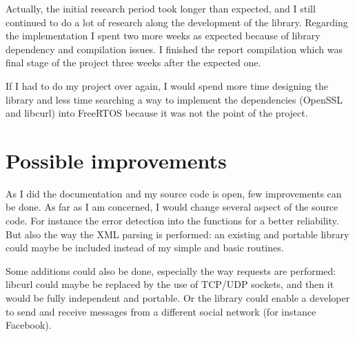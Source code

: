 Actually, the initial research period took longer than expected, and I still continued to do a lot of research along the development of the library. 
Regarding the implementation I spent two more weeks as expected because of library dependency and compilation issues. I finished the report compilation which was final stage of the project three weeks after the expected one.

If I had to do my project over again, I would spend more time designing the library and less time searching a way to implement the dependencies (OpenSSL and libcurl) into FreeRTOS because it was not the point of the project.


\section{Possible improvements}

\hspace{15mm}As I did the documentation and my source code is open, few improvements can be done. As far as I am concerned, I would change several aspect of the source code. For instance the error detection into the functions for a better reliability. But also the way the XML parsing is performed: an existing and portable library could maybe be included instead of my simple and basic routines.

Some additions could also be done, especially the way requests are performed: libcurl could maybe be replaced by the use of TCP/UDP sockets, and then it would be fully independent and portable. Or the library could enable a developer to send and receive messages from a different social network (for instance Facebook).


\clearpage